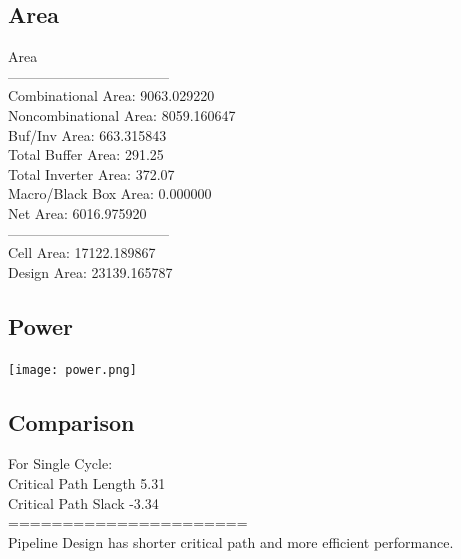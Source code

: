 \documentclass{article}
\begin{document}
	\subsection{Area}
Area\\
  -----------------------------------\\
  Combinational Area:     9063.029220\\
  Noncombinational Area:  8059.160647\\
  Buf/Inv Area:            663.315843\\
  Total Buffer Area:           291.25\\
  Total Inverter Area:         372.07\\
  Macro/Black Box Area:      0.000000\\
  Net Area:               6016.975920\\
  -----------------------------------\\
  Cell Area:             17122.189867\\
  Design Area:           23139.165787\\
	\subsection{Power}
	\texttt{[image: power.png]}
	\subsection{Comparison}
	For Single Cycle:\\
	Critical Path Length 5.31\\
	Critical Path Slack -3.34\\
	======================\\
	Pipeline Design has shorter critical path and more efficient performance.
	
\end{document}
